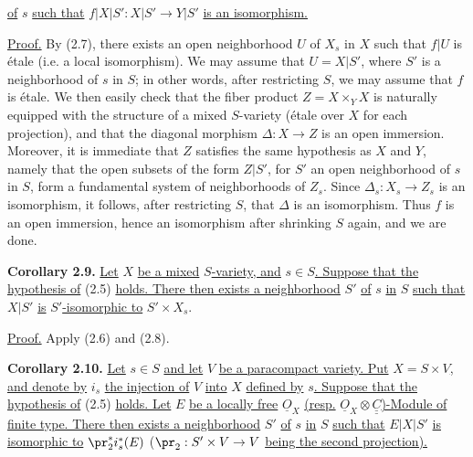 %
\uline{of} $s$ \uline{such that} $f|X|S':X|S'\longrightarrow Y|S'$
\uline{is an isomorphism.}

\uline{Proof.} By (2.7), there exists an open neighborhood $U$ of $X_s$ in $X$ such that $f|U$ is étale (i.e. a local isomorphism). We may assume that $U=X|S'$, where $S'$ is a neighborhood of $s$ in $S$; in other words, after restricting $S$, we may assume that $f$ is étale. We then easily check that the fiber product $Z=X\times_Y X$ is naturally equipped with the structure of a mixed $S$-variety (étale over $X$ for each projection), and that the diagonal morphism $\Delta:X\to Z$ is an open immersion. Moreover, it is immediate that $Z$ satisfies the same hypothesis as $X$ and $Y$, namely that the open subsets of the form $Z|S'$, for $S'$ an open neighborhood of $s$ in $S$, form a fundamental system of neighborhoods of $Z_s$. Since $\Delta_s:X_s\to Z_s$ is an isomorphism, it follows, after restricting $S$, that $\Delta$ is an isomorphism. Thus $f$ is an open immersion, hence an isomorphism after shrinking $S$ again, and we are done.

\textbf{Corollary 2.9.} \uline{Let} $X$ \uline{be a mixed} $S$\uline{-variety, and} $s\in S$\uline{. Suppose that the hypothesis of} (2.5) \uline{holds. There then exists a neighborhood} $S'$ \uline{of} $s$ \uline{in} $S$ \uline{such that} $X|S'$ \uline{is} $S'$\uline{-isomorphic to} $S'\times X_s$.

\uline{Proof.} Apply (2.6) and (2.8).

\textbf{Corollary 2.10.} \uline{Let} $s\in S$ \uline{and let} $V$ \uline{be a paracompact variety. Put} $X=S\times V$\uline{, and denote by} $i_s$ \uline{the injection of} $V$ \uline{into} $X$ \uline{defined by} $s$\uline{. Suppose that the hypothesis of} (2.5) \uline{holds. Let} $E$ \uline{be a locally free} $\underline{O}_X$ \uline{(resp.} $\underline{O}_X\otimes\underline{\underline{C}}$\uline{)-Module of finite type. There then exists a neighborhood} $S'$ \uline{of} $s$ \uline{in} $S$ \uline{such that} $E|X|S'$ \uline{is isomorphic to} $\pr_2^*i_s^*(E)$ ($\pr_2:S'\times V\to V$ \uline{being the second projection).}

